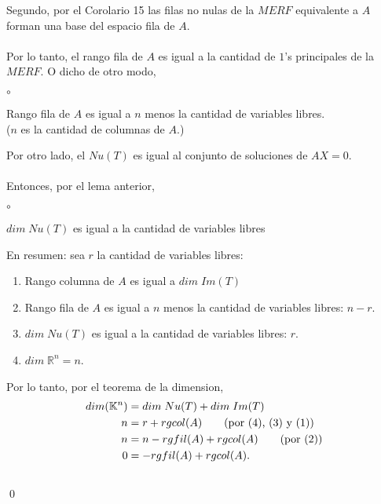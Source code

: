 \documentclass{article}
\theoremstyle{definition}
\theoremstyle{definition}
\theoremstyle{remark}
\begin{document}
Segundo, por el Corolario 15 las filas no nulas de la $MERF$ equivalente a $A$ forman una base del espacio fila de $A$. \\\\
Por lo tanto, el rango fila de $A$ es igual a la cantidad de $1$'s principales de la $MERF$. O dicho de otro modo, 
\begin{list}{$\circ$}{}  
\item Rango fila de $A$ es igual a $n$ menos la cantidad de variables libres. \\ ($n$ es la cantidad de columnas de $A$.)
\end{list}
Por otro lado, el $Nu(T)$ es igual al conjunto de soluciones de $AX=0$. \\ \\ Entonces, por el lema anterior, 
\begin{list}{$\circ$}{}  
\item  $dim\; Nu(T)$ es igual a la cantidad de variables libres
\end{list}
En resumen: sea $r$ la cantidad de variables libres: \begin{enumerate}[label=(\arabic*)]
  \item Rango columna de $A$ es igual a $dim \; Im(T)$
  \item Rango fila de $A$ es igual a $n$ menos la cantidad de variables libres: $n-r$. 
  \item $dim\;Nu(T)$ es igual a la cantidad de variables libres: $r$. 
  \item $dim\; \mathbb{R}^n= n$.
\end{enumerate}
Por lo tanto, por el teorema de la dimension, 
  \begin{align}
    dim(\mathbb{K}^n) &= dim\;Nu(T) + dim\;Im(T) \notag \\
    n&=r+rgcol(A) \tag{por (4), (3) y (1)} \\
    n&=n-rgfil(A)+rgcol(A) \tag{por (2)} \\
    0&=-rgfil(A)+rgcol(A). \notag
  \end{align} \\ \qed \pagebreak
\end{document}
